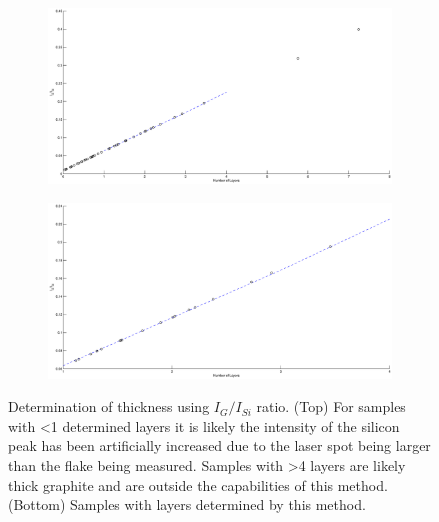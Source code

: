\documentclass[12pt,titlepage]{article}
\begin{document}
	\begin{figure}
		\centering
		\begin{subfigure}{1\textwidth}
			\centering
			\includegraphics[width=\textwidth]{figures/thickness-data.eps}
			\label{fig:thickness-data-out}
		\end{subfigure}
		\begin{subfigure}{1\textwidth}
			\centering
			\includegraphics[width=\textwidth]{figures/thickness-data-zoom.eps}
			\label{fig:thickness-data-zoom}
		\end{subfigure}
		\caption[Determination of thickness using $I_G/I_{Si}$ ratio.]{Determination of thickness using $I_G/I_{Si}$ ratio. (Top) For samples with \textless 1 determined layers it is likely the intensity of the silicon peak has been artificially increased due to the laser spot being larger than the flake being measured. Samples with \textgreater 4 layers are likely thick graphite and are outside the capabilities of this method. (Bottom) Samples with layers determined by this method.}
		\label{fig:thickness-data}
	\end{figure}
	
\end{document}
